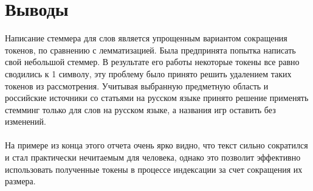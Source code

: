 \section{Выводы}
Написание стеммера для слов является упрощенным вариантом сокращения токенов, по сравнению с лемматизацией. Была предпринята попытка написать свой небольшой стеммер. В результате его работы некоторые токены все равно сводились к 1 символу, эту проблему было принято решить удалением таких токенов из рассмотрения. Учитывая выбранную предметную область и российские источники со статьями на русском языке принято решение применять стемминг только для слов на русском языке, а названия игр оставить без изменений. \\ \\ На примере из конца этого отчета очень ярко видно, что текст сильно сократился и стал практически нечитаемым для человека, однако это позволит эффективно использовать полученные токены в процессе индексации за счет сокращения их размера.
\pagebreak
